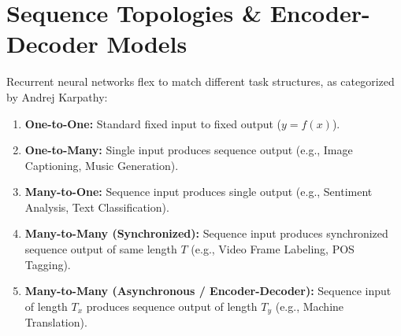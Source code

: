 \section{Sequence Topologies \& Encoder-Decoder Models}

Recurrent neural networks flex to match different task structures, as categorized by Andrej Karpathy:

\begin{enumerate}
    \item \textbf{One-to-One:} Standard fixed input to fixed output ($y = f(x)$).
    \item \textbf{One-to-Many:} Single input produces sequence output (e.g., Image Captioning, Music Generation).
    \item \textbf{Many-to-One:} Sequence input produces single output (e.g., Sentiment Analysis, Text Classification).
    \item \textbf{Many-to-Many (Synchronized):} Sequence input produces synchronized sequence output of same length $T$ (e.g., Video Frame Labeling, POS Tagging).
    \item \textbf{Many-to-Many (Asynchronous / Encoder-Decoder):} Sequence input of length $T_x$ produces sequence output of length $T_y$ (e.g., Machine Translation).
\end{enumerate}

